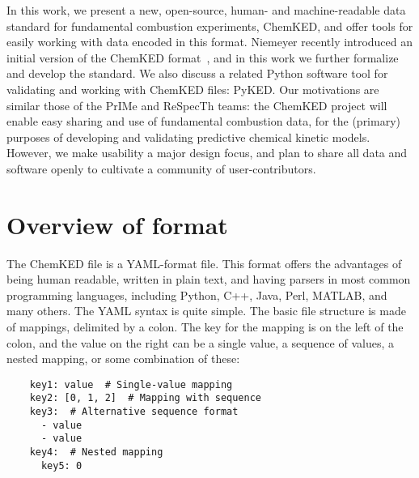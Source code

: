 \documentclass[12pt]{ussci}
\newcommand\ck{ChemKED}
\newcommand\pk{PyKED}
\begin{document}
In this work, we present a new, open-source, human- and machine-readable data standard for fundamental combustion
experiments, \ck{}, and offer tools for easily working with data encoded in this format.
Niemeyer recently introduced an initial version of the \ck{} format~\autocite{Niemeyer:2016wf},
and in this work we further formalize and develop the standard. We also discuss a related
Python software tool for validating and working with \ck{} files: \pk{}.
Our motivations are similar those of the PrIMe and ReSpecTh teams:
the \ck{} project will enable easy sharing and use of fundamental combustion data,
for the (primary) purposes of developing and validating predictive chemical kinetic models.
However, we make usability a major design focus, and plan to share all data and software openly
to cultivate a community of user-contributors.

\section{Overview of format}\label{sec:overview-of-format}

The \ck{} file is a YAML-format file. This format offers the advantages of being
human readable, written in plain text, and having parsers in most common
programming languages, including Python, C++, Java, Perl, MATLAB, and many
others. The YAML syntax is quite simple. The basic file structure is made of
mappings, delimited by a colon. The key for the mapping is on the left of the
colon, and the value on the right can be a single value, a sequence of values,
a nested mapping, or some combination of these:

\begin{verbatim}
    key1: value  # Single-value mapping
    key2: [0, 1, 2]  # Mapping with sequence
    key3:  # Alternative sequence format
      - value
      - value
    key4:  # Nested mapping
      key5: 0
\end{verbatim}
\end{document}
